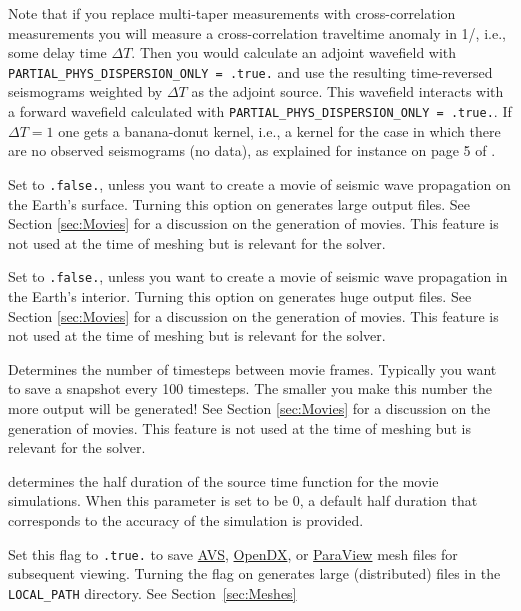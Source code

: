 \begin{description}
\begin{enumerate}
\end{enumerate}
Note that if you replace multi-taper measurements with cross-correlation measurements you will measure a cross-correlation traveltime anomaly in 1/, i.e., some delay time $\Delta T$. Then you would calculate an adjoint wavefield with \texttt{PARTIAL\_PHYS\_DISPERSION\_ONLY = .true.} and use the resulting time-reversed seismograms weighted by $\Delta T$ as the adjoint source. This wavefield interacts with a forward wavefield calculated with \texttt{PARTIAL\_PHYS\_DISPERSION\_ONLY = .true.}.
If $\Delta T=1$ one gets a banana-donut kernel, i.e., a kernel for the case in which there are no observed seismograms (no data), as explained for instance on page 5 of \cite{ZhLiTr11}.
%
\item [{\texttt{MOVIE\_SURFACE}}] Set to \texttt{.false.}, unless you want
to create a movie of seismic wave propagation on the Earth's surface.
Turning this option on generates large output files. See Section \ref{sec:Movies}
for a discussion on the generation of movies. This feature is not
used at the time of meshing but is relevant for the solver.
%
\item [{\texttt{MOVIE\_VOLUME}}] Set to \texttt{.false.}, unless you want
to create a movie of seismic wave propagation in the Earth's interior.
Turning this option on generates huge output files. See Section \ref{sec:Movies}
for a discussion on the generation of movies. This feature is not
used at the time of meshing but is relevant for the solver.
%
\item [{\texttt{NTSTEP\_BETWEEN\_FRAMES}}] Determines the number of timesteps
between movie frames. Typically you want to save a snapshot every
100 timesteps. The smaller you make this number the more output will
be generated! See Section \ref{sec:Movies} for a discussion on the
generation of movies. This feature is not used at the time of meshing
but is relevant for the solver.
%
\item [{\texttt{HDUR\_MOVIE}}] determines the half duration of the source
time function for the movie simulations. When this parameter is set
to be 0, a default half duration that corresponds to the accuracy
of the simulation is provided.
%
\item [{\texttt{SAVE\_MESH\_FILES}}] Set this flag to \texttt{.true}\texttt{\small .}
to save \href{http://www.avs.com}{AVS}, \href{http://www.opendx.org}{OpenDX}, or \href{http://www.paraview.org}{ParaView}
mesh files for subsequent viewing. Turning the flag on generates large
(distributed) files in the \texttt{LOCAL\_PATH} directory. See Section~\ref{sec:Meshes}

\end{description}
